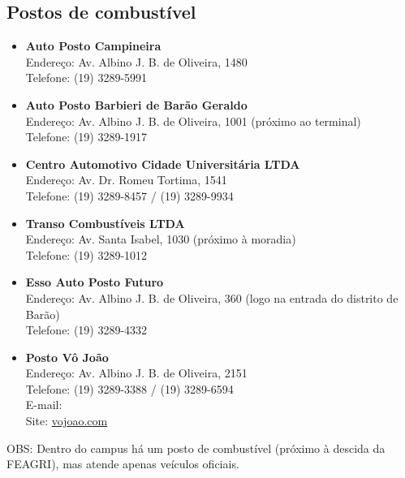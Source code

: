 \subsection{Postos de combustível}

\begin{itemize}
    \item   \textbf{Auto Posto Campineira}
        \\Endereço: Av. Albino J. B. de Oliveira, 1480
        \\Telefone: (19) 3289-5991

    \item   \textbf{Auto Posto Barbieri de Barão Geraldo}
        \\Endereço: Av. Albino J. B. de Oliveira, 1001 (próximo ao terminal)
        \\Telefone: (19) 3289-1917

    \item   \textbf{Centro Automotivo Cidade Universitária LTDA}
        \\Endereço: Av. Dr. Romeu Tortima, 1541
        \\Telefone: (19) 3289-8457 / (19) 3289-9934

    \item   \textbf{Transo Combustíveis LTDA}
        \\Endereço: Av. Santa Isabel, 1030 (próximo à moradia)
        \\Telefone: (19) 3289-1012

    \item   \textbf{Esso Auto Posto Futuro}
        \\Endereço: Av. Albino J. B. de Oliveira, 360 (logo na entrada do distrito de Barão)
        \\Telefone: (19) 3289-4332

    \item   \textbf{Posto Vô João}
        \\Endereço: Av. Albino J. B. de Oliveira, 2151
        \\Telefone: (19) 3289-3388 / (19) 3289-6594
        \\E-mail: 
        \\Site: \url{vojoao.com}
\end{itemize}

OBS: Dentro do campus há um posto de combustível (próximo à descida da FEAGRI),
mas atende apenas veículos oficiais.
